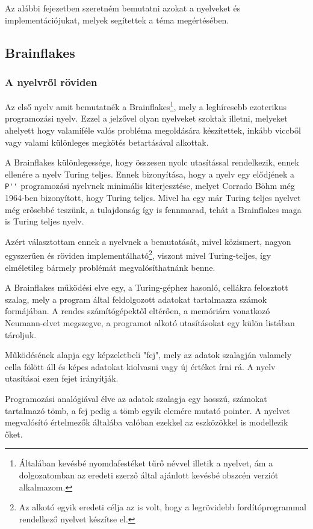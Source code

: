 Az alábbi fejezetben szeretném bemutatni azokat a nyelveket és implementációjukat, melyek segítettek a téma megértésében.

\subsection{Brainflakes}

\subsubsection{A nyelvről röviden}

Az első nyelv amit bemutatnék a Brainflakes\footnote{Általában kevésbé nyomdafestéket tűrő névvel illetik a nyelvet, ám a dolgozatomban az eredeti szerző által ajánlott kevésbé obszcén verziót alkalmazom.}, mely a leghíresebb ezoterikus programozási nyelv. Ezzel a jelzővel olyan nyelveket szoktak illetni, melyeket ahelyett hogy valamiféle valós probléma megoldására készítettek, inkább viccből vagy valami különleges megkötés betartásával alkottak.

A Brainflakes különlegessége, hogy összesen nyolc utasítással rendelkezik, ennek ellenére a nyelv Turing teljes. Ennek bizonyítása, hogy a nyelv egy elődjének a \verb|P''| programozási nyelvnek minimális kiterjesztése, melyet Corrado Böhm még 1964-ben bizonyított\cite{plang}, hogy Turing teljes. Mivel ha egy már Turing teljes nyelvet még erősebbé teszünk, a tulajdonság így is fennmarad, tehát a Brainflakes maga is Turing teljes nyelv.

Azért választottam ennek a nyelvnek a bemutatását, mivel közismert, nagyon egyszerűen és röviden implementálható\footnote{Az alkotó egyik eredeti célja az is volt, hogy a legrövidebb fordítóprogrammal rendelkező nyelvet készítse el.\cite{bf}}, viszont mivel Turing-teljes, így elméletileg bármely problémát megvalósíthatnánk benne.

A Brainflakes működési elve egy, a Turing-géphez hasonló, cellákra felosztott szalag, mely a program által feldolgozott adatokat tartalmazza számok formájában. A rendes számítógépektől eltérően, a memóriára vonatkozó Neumann-elvet megszegve, a programot alkotó utasításokat egy külön listában tároljuk.

Működésének alapja egy képzeletbeli "fej", mely az adatok szalagján valamely cella fölött áll és képes adatokat kiolvasni vagy új értéket írni rá. A nyelv utasításai ezen fejet irányítják.

Programozási analógiával élve az adatok szalagja egy hosszú, számokat tartalmazó tömb, a fej pedig a tömb egyik elemére mutató pointer. A nyelvet megvalósító értelmezők általába valóban ezekkel az eszközökkel is modellezik őket.

